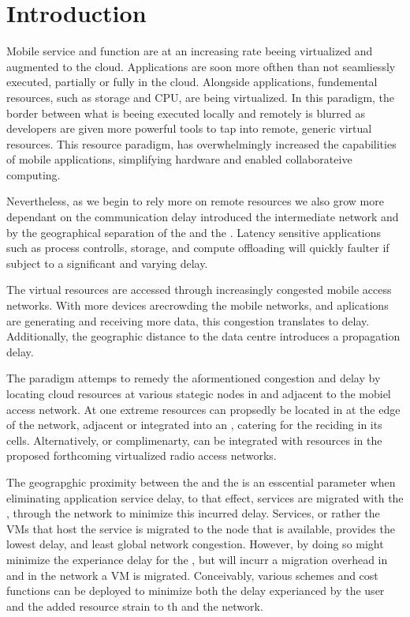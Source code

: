 \section{Introduction}
Mobile service and function are at an increasing rate beeing virtualized and augmented to the cloud. Applications are soon more ofthen than not seamliessly executed, partially or fully in the cloud. Alongside applications, fundemental \ue resources, such as storage and CPU, are being virtualized. In this paradigm, the border between what is beeing executed locally and remotely is blurred as developers are given more powerful tools to tap into remote, generic virtual resources. This resource paradigm, has overwhelmingly increased the capabilities of mobile applications, simplifying hardware and enabled collaborateive computing. 

Nevertheless, as we begin to rely more on remote resources we also grow more dependant on the communication delay introduced the intermediate network and by the geographical separation of the \ue and the \dc. Latency sensitive applications such as process controlls, storage, and compute offloading will quickly faulter if subject to a significant and varying delay.

The virtual resources are accessed through increasingly congested mobile access networks. With more devices arecrowding the mobile networks, and aplications are generating and receiving more data, this congestion translates to delay. Additionally, the geographic distance to the data centre introduces a propagation delay.

The \xcloud paradigm attemps to remedy the aformentioned congestion and delay by locating cloud resources at various stategic nodes in and adjacent to the mobiel access network. At one extreme \dc resources can propsedly be located in at the edge of the network, adjacent or integrated into an \rbs, catering for the \ues reciding in its cells. Alternatively, or complimenarty, \dcs can be integrated with resources in the proposed forthcoming virtualized radio access networks.

The geograpghic proximity between the \ue and the \dc is an esscential parameter when eliminating application service delay, to that effect, services are migrated with the \ue, through the network to minimize this incurred delay. Services, or rather the VMs that host the service is migrated to the node that is available, provides the lowest delay, and least global network congestion. However, by doing so might minimize the experiance delay for the \ue, but will incurr a migration overhead in \dc and in the network a VM is migrated. Conceivably, various schemes and cost functions can be deployed to minimize both the delay experianced by the user and the added resource strain to th \dc and the network.

